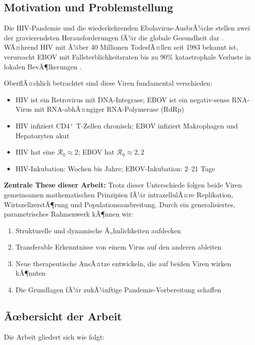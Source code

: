 ﻿\documentclass[a4paper,12pt]{article}
\theoremstyle{definition}
\begin{document}
\subsection{Motivation und Problemstellung}

Die HIV-Pandemie und die wiederkehrenden Ebolavirus-AusbrÃ¼che stellen zwei der gravierendsten Herausforderungen fÃ¼r die globale Gesundheit dar \cite{bekker2023hiv, johnson2023ebola}. WÃ¤hrend HIV mit Ã¼ber 40 Millionen TodesfÃ¤llen seit 1983 bekannt ist, verursacht EBOV mit Fallsterblichkeitsraten bis zu 90\% katastrophale Verluste in lokalen BevÃ¶lkerungen \cite{who2016report}.

OberflÃ¤chlich betrachtet sind diese Viren fundamental verschieden:
\begin{itemize}
\item HIV ist ein Retrovirus mit DNA-Integrase; EBOV ist ein negativ-sense RNA-Virus mit RNA-abhÃ¤ngiger RNA-Polymerase (RdRp)
\item HIV infiziert CD4$^+$ T-Zellen chronisch; EBOV infiziert Makrophagen und Hepatozyten akut
\item HIV hat eine $\mathcal{R}_0 \approx 2$; EBOV hat $\mathcal{R}_0 \approx 2,2$ 
\item HIV-Inkubation: Wochen bis Jahre; EBOV-Inkubation: 2--21 Tage
\end{itemize}

\textbf{Zentrale These dieser Arbeit:} Trotz dieser Unterschiede folgen beide Viren gemeinsamen mathematischen Prinzipien fÃ¼r intrazellulÃ¤re Replikation, WirtszellzerstÃ¶rung und Populationsausbreitung. Durch ein generalisiertes, parametrisches Rahmenwerk kÃ¶nnen wir:

\begin{enumerate}
\item Strukturelle und dynamische Ã„hnlichkeiten aufdecken
\item Transferable Erkenntnisse von einem Virus auf den anderen ableiten
\item Neue therapeutische AnsÃ¤tze entwickeln, die auf beiden Viren wirken kÃ¶nnten
\item Die Grundlagen fÃ¼r zukÃ¼nftige Pandemie-Vorbereitung schaffen
\end{enumerate}

\subsection{Ãœbersicht der Arbeit}

Die Arbeit gliedert sich wie folgt:
\end{document}
